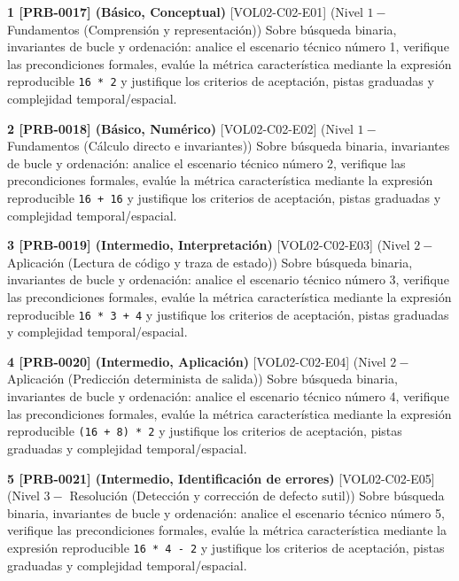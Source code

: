 \documentclass{book}
\begin{document}
\begin{tcolorbox}[title={Ejercicios}, studiumworked, breakable]

\noindent\textbf{1 [PRB-0017] (Básico, Conceptual)}
[VOL02-C02-E01] (Nivel \(1 -\) Fundamentos (Comprensión y representación)) Sobre búsqueda binaria, invariantes de bucle y ordenación: analice el escenario técnico número 1, verifique las precondiciones formales, evalúe la métrica característica mediante la expresión reproducible \texttt{16 * 2} y justifique los criterios de aceptación, pistas graduadas y complejidad temporal/espacial.

\noindent\textbf{2 [PRB-0018] (Básico, Numérico)}
[VOL02-C02-E02] (Nivel \(1 -\) Fundamentos (Cálculo directo e invariantes)) Sobre búsqueda binaria, invariantes de bucle y ordenación: analice el escenario técnico número 2, verifique las precondiciones formales, evalúe la métrica característica mediante la expresión reproducible \texttt{16 + 16} y justifique los criterios de aceptación, pistas graduadas y complejidad temporal/espacial.

\noindent\textbf{3 [PRB-0019] (Intermedio, Interpretación)}
[VOL02-C02-E03] (Nivel \(2 -\) Aplicación (Lectura de código y traza de estado)) Sobre búsqueda binaria, invariantes de bucle y ordenación: analice el escenario técnico número 3, verifique las precondiciones formales, evalúe la métrica característica mediante la expresión reproducible \texttt{16 * 3 + 4} y justifique los criterios de aceptación, pistas graduadas y complejidad temporal/espacial.

\noindent\textbf{4 [PRB-0020] (Intermedio, Aplicación)}
[VOL02-C02-E04] (Nivel \(2 -\) Aplicación (Predicción determinista de salida)) Sobre búsqueda binaria, invariantes de bucle y ordenación: analice el escenario técnico número 4, verifique las precondiciones formales, evalúe la métrica característica mediante la expresión reproducible \texttt{(16 + 8) * 2} y justifique los criterios de aceptación, pistas graduadas y complejidad temporal/espacial.

\noindent\textbf{5 [PRB-0021] (Intermedio, Identificación de errores)}
[VOL02-C02-E05] (Nivel \(3 -\) Resolución (Detección y corrección de defecto sutil)) Sobre búsqueda binaria, invariantes de bucle y ordenación: analice el escenario técnico número 5, verifique las precondiciones formales, evalúe la métrica característica mediante la expresión reproducible \texttt{16 * 4 - 2} y justifique los criterios de aceptación, pistas graduadas y complejidad temporal/espacial.


\end{tcolorbox}
\end{document}

